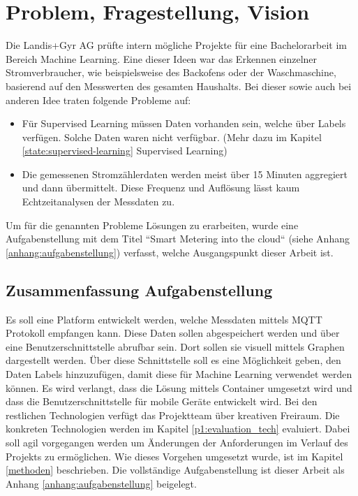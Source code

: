 \chapter{Problem, Fragestellung, Vision}
\label{cap1}
Die Landis+Gyr AG prüfte intern mögliche Projekte für eine Bachelorarbeit im Bereich Machine Learning.
Eine dieser Ideen war das Erkennen einzelner Stromverbraucher, wie beispielsweise des Backofens oder der Waschmaschine,
basierend auf den Messwerten des gesamten Haushalts.
Bei dieser sowie auch bei anderen Idee traten folgende Probleme auf:
\begin{itemize}
      \item Für Supervised Learning müssen Daten vorhanden sein,
            welche über Labels verfügen. 
            Solche Daten waren nicht verfügbar. (Mehr dazu im Kapitel \ref{state:supervised-learning} Supervised Learning)
      \item Die gemessenen Stromzählerdaten werden meist über 15 Minuten aggregiert und dann übermittelt.
            Diese Frequenz und Auflösung lässt kaum Echtzeitanalysen der Messdaten zu.

\end{itemize}

Um für die genannten Probleme Lösungen zu erarbeiten, wurde eine Aufgabenstellung mit dem Titel ``Smart Metering into the cloud`` (siehe Anhang \ref{anhang:aufgabenstellung}) verfasst,
welche Ausgangspunkt dieser Arbeit ist.

\section{Zusammenfassung Aufgabenstellung}
\label{aufgabenstellung}

Es soll eine Platform entwickelt werden, welche Messdaten mittels \ac{MQTT} Protokoll  empfangen kann.
Diese Daten sollen abgespeichert werden und über eine Benutzerschnittstelle abrufbar sein.
Dort sollen sie visuell mittels Graphen dargestellt werden.
Über diese Schnittstelle soll es eine Möglichkeit geben, den Daten Labels hinzuzufügen,
damit diese für Machine Learning verwendet werden können.
Es wird verlangt, dass die Lösung mittels Container umgesetzt wird und dass die Benutzerschnittstelle für mobile Geräte entwickelt wird.
Bei den restlichen Technologien verfügt das Projektteam über kreativen Freiraum.
Die konkreten Technologien werden im Kapitel \ref{p1:evaluation_tech} evaluiert.
Dabei soll agil vorgegangen werden um Änderungen der Anforderungen im Verlauf des Projekts zu ermöglichen.
Wie dieses Vorgehen umgesetzt wurde, ist im Kapitel \ref{methoden} beschrieben.
Die vollständige Aufgabenstellung ist dieser Arbeit als Anhang \ref{anhang:aufgabenstellung} beigelegt.

